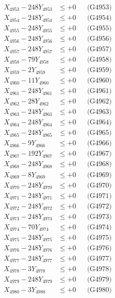 \documentclass[a4paper,10pt]{article}
\begin{document}
{\begin{align}
X_{4953} - 248Y_{4953} &\leq +0 && \text{(G4953)} \\
X_{4954} - 248Y_{4954} &\leq +0 && \text{(G4954)} \\
X_{4955} - 248Y_{4955} &\leq +0 && \text{(G4955)} \\
X_{4956} - 248Y_{4956} &\leq +0 && \text{(G4956)} \\
X_{4957} - 248Y_{4957} &\leq +0 && \text{(G4957)} \\
X_{4958} - 79Y_{4958} &\leq +0 && \text{(G4958)} \\
X_{4959} - 2Y_{4959} &\leq +0 && \text{(G4959)} \\
X_{4960} - 11Y_{4960} &\leq +0 && \text{(G4960)} \\
\allowbreak
X_{4961} - 248Y_{4961} &\leq +0 && \text{(G4961)} \\
X_{4962} - 28Y_{4962} &\leq +0 && \text{(G4962)} \\
X_{4963} - 248Y_{4963} &\leq +0 && \text{(G4963)} \\
X_{4964} - 248Y_{4964} &\leq +0 && \text{(G4964)} \\
X_{4965} - 248Y_{4965} &\leq +0 && \text{(G4965)} \\
X_{4966} - 9Y_{4966} &\leq +0 && \text{(G4966)} \\
X_{4967} - 192Y_{4967} &\leq +0 && \text{(G4967)} \\
X_{4968} - 248Y_{4968} &\leq +0 && \text{(G4968)} \\
X_{4969} - 8Y_{4969} &\leq +0 && \text{(G4969)} \\
X_{4970} - 248Y_{4970} &\leq +0 && \text{(G4970)} \\
\allowbreak
X_{4971} - 248Y_{4971} &\leq +0 && \text{(G4971)} \\
X_{4972} - 248Y_{4972} &\leq +0 && \text{(G4972)} \\
X_{4973} - 248Y_{4973} &\leq +0 && \text{(G4973)} \\
X_{4974} - 70Y_{4974} &\leq +0 && \text{(G4974)} \\
X_{4975} - 248Y_{4975} &\leq +0 && \text{(G4975)} \\
X_{4976} - 248Y_{4976} &\leq +0 && \text{(G4976)} \\
X_{4977} - 248Y_{4977} &\leq +0 && \text{(G4977)} \\
X_{4978} - 3Y_{4978} &\leq +0 && \text{(G4978)} \\
X_{4979} - 248Y_{4979} &\leq +0 && \text{(G4979)} \\
X_{4980} - 3Y_{4980} &\leq +0 && \text{(G4980)} \\

\end{align}}
\end{document}
